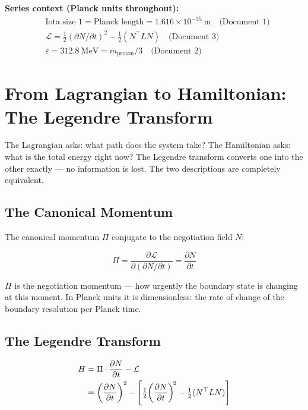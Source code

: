 \documentclass[11pt,letterpaper]{article}
\newenvironment{plainbox}{\begin{tcolorbox}[colback=blue!3!white,colframe=blue!40!white,title={\small\textit{In plain language}},breakable]}{\end{tcolorbox}}
\newenvironment{defbox}{\begin{tcolorbox}[colback=green!3!white,colframe=green!45!black,title={\small\textit{Foundational definition}},breakable]}{\end{tcolorbox}}
\begin{document}
\begin{defbox}
\textbf{Series context (Planck units throughout):}
\begin{align*}
&\text{Iota size } 1 = \text{Planck length} = 1.616 \times 10^{-35}\ \text{m} \quad \text{(Document 1)}\\
&\mathcal{L} = \tfrac{1}{2}(\partial N/\partial t)^2 - \tfrac{1}{2}(N^\top L N) \quad \text{(Document 3)}\\
&\varepsilon = 312.8\ \text{MeV} = m_\text{proton}/3 \quad \text{(Document 2)}
\end{align*}
\end{defbox}

\section{From Lagrangian to Hamiltonian: The Legendre Transform}
\label{sec:orga64c3d0}

\begin{plainbox}
The Lagrangian asks: what path does the system take? The Hamiltonian asks: what is the total energy right now? The Legendre transform converts one into the other exactly --- no information is lost. The two descriptions are completely equivalent.
\end{plainbox}

\subsection{The Canonical Momentum}
\label{sec:org63c589e}

The canonical momentum \(\Pi\) conjugate to the negotiation field \(N\):

\begin{equation}
\Pi = \frac{\partial \mathcal{L}}{\partial(\partial N/\partial t)} = \frac{\partial N}{\partial t}
\end{equation}

\(\Pi\) is the negotiation momentum --- how urgently the boundary state is changing at this moment. In Planck units it is dimensionless: the rate of change of the boundary resolution per Planck time.

\subsection{The Legendre Transform}
\label{sec:org55d9514}

\begin{align}
H &= \Pi \cdot \frac{\partial N}{\partial t} - \mathcal{L} \notag\\
  &= \left(\frac{\partial N}{\partial t}\right)^2 - \left[\tfrac{1}{2}\!\left(\frac{\partial N}{\partial t}\right)^{\!2} - \tfrac{1}{2}(N^\top L N)\right]
\end{align}
\end{document}
